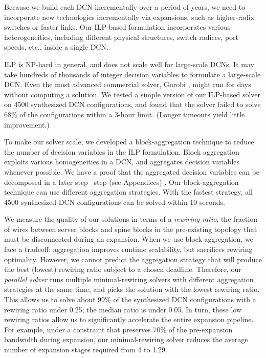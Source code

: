 \documentclass[letterpaper,twocolumn,10pt]{article}
\begin{document}
Because we build each DCN incrementally over a period of years, we need to incorporate new technologies incrementally via expansions, such as higher-radix switches or faster links.  Our ILP-based formulation incorporates various heterogeneities, including different physical structures, switch radices, port speeds, etc., inside a single DCN. 

ILP is NP-hard in general, and does not scale well for large-scale DCNs. It may take hundreds of thousands of integer decision variables to formulate a large-scale DCN. Even the most advanced commercial solver, Gurobi \cite{Gurobi}, might run for days without  computing a solution. We tested a simple version of our ILP-based solver on 4500 synthesized DCN configurations, and found that the solver failed to solve 68\% of the configurations within a 3-hour limit.  (Longer timeouts yield little improvement.)

To make our solver scale, we developed a block-aggregation technique to reduce the number of decision variables in the ILP formulation. Block aggregation exploits various homogeneities in a DCN, and aggregates decision variables whenever possible. We have a proof that the aggregated decision variables can be decomposed in a later 
{\ifpaper step~\cite{TechnicalReport} \else step (see Appendices) \fi}.
Our block-aggregation technique can use different aggregation strategies. With the fastest strategy, all 4500 synthesized DCN configurations can be solved within 10 seconds.

We measure the quality of our solutions in terms of a \emph{rewiring ratio}, the fraction of wires between server blocks and spine blocks in the pre-existing topology that must be disconnected during an expansion.  When we use block aggregation, we face a tradeoff: aggregation improves runtime scalability, but sacrifices rewiring optimality. However, we cannot predict the aggregation strategy that will produce the best (lowest) rewiring ratio subject to a chosen deadline. Therefore, our \emph{parallel solver} runs multiple minimal-rewiring solvers with different aggregation strategies at the same time, and picks the solution with the lowest rewiring ratio. This allows us to solve about 99\% of the synthesized DCN configurations with a rewiring ratio under 0.25; the median ratio is under 0.05. In turn, these low rewiring ratios allow us to significantly accelerate the entire expansion pipeline. For example, under a constraint that preserves 70\% of the pre-expansion  bandwidth during expansion, our minimal-rewiring solver reduces the average number of expansion stages required from 4 to 1.29.
\end{document}
